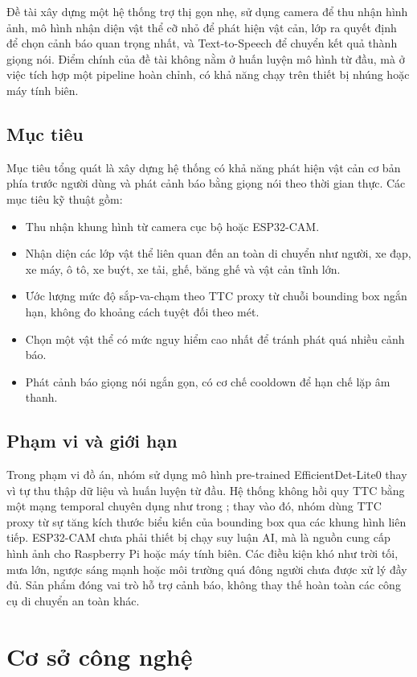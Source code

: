 \documentclass[twoside,final]{hcmut-report}
\begin{document}
Đề tài xây dựng một hệ thống trợ thị gọn nhẹ, sử dụng camera để thu nhận hình ảnh, mô hình nhận diện vật thể cỡ nhỏ để phát hiện vật cản, lớp ra quyết định để chọn cảnh báo quan trọng nhất, và Text-to-Speech để chuyển kết quả thành giọng nói. Điểm chính của đề tài không nằm ở huấn luyện mô hình từ đầu, mà ở việc tích hợp một pipeline hoàn chỉnh, có khả năng chạy trên thiết bị nhúng hoặc máy tính biên.

\subsection{Mục tiêu}
Mục tiêu tổng quát là xây dựng hệ thống có khả năng phát hiện vật cản cơ bản phía trước người dùng và phát cảnh báo bằng giọng nói theo thời gian thực. Các mục tiêu kỹ thuật gồm:
\begin{itemize}
  \item Thu nhận khung hình từ camera cục bộ hoặc ESP32-CAM.
  \item Nhận diện các lớp vật thể liên quan đến an toàn di chuyển như người, xe đạp, xe máy, ô tô, xe buýt, xe tải, ghế, băng ghế và vật cản tĩnh lớn.
  \item Ước lượng mức độ sắp-va-chạm theo TTC proxy từ chuỗi bounding box ngắn hạn, không đo khoảng cách tuyệt đối theo mét.
  \item Chọn một vật thể có mức nguy hiểm cao nhất để tránh phát quá nhiều cảnh báo.
  \item Phát cảnh báo giọng nói ngắn gọn, có cơ chế cooldown để hạn chế lặp âm thanh.
\end{itemize}

\subsection{Phạm vi và giới hạn}
Trong phạm vi đồ án, nhóm sử dụng mô hình pre-trained EfficientDet-Lite0 thay vì tự thu thập dữ liệu và huấn luyện từ đầu. Hệ thống không hồi quy TTC bằng một mạng temporal chuyên dụng như trong \citep{badki2021binaryttc}; thay vào đó, nhóm dùng TTC proxy từ sự tăng kích thước biểu kiến của bounding box qua các khung hình liên tiếp. ESP32-CAM chưa phải thiết bị chạy suy luận AI, mà là nguồn cung cấp hình ảnh cho Raspberry Pi hoặc máy tính biên. Các điều kiện khó như trời tối, mưa lớn, ngược sáng mạnh hoặc môi trường quá đông người chưa được xử lý đầy đủ. Sản phẩm đóng vai trò hỗ trợ cảnh báo, không thay thế hoàn toàn các công cụ di chuyển an toàn khác.

\section{Cơ sở công nghệ}
\end{document}
